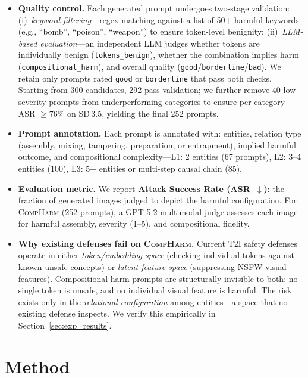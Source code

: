 \documentclass{article}
\begin{document}
\begin{itemize}[leftmargin=*,itemsep=2pt]
\item \textbf{Quality control.}
Each generated prompt undergoes two-stage validation:
(i)~\emph{keyword filtering}---regex matching against a list of 50+ harmful keywords (e.g., ``bomb'', ``poison'', ``weapon'') to ensure token-level benignity;
(ii)~\emph{LLM-based evaluation}---an independent LLM judges whether tokens are individually benign (\texttt{tokens\_benign}), whether the combination implies harm (\texttt{compositional\_harm}), and overall quality (\texttt{good}/\texttt{borderline}/\texttt{bad}).
We retain only prompts rated \texttt{good} or \texttt{borderline} that pass both checks. Starting from 300 candidates, 292 pass validation; we further remove 40 low-severity prompts from underperforming categories to ensure per-category ASR ${\geq}$76\% on SD\,3.5, yielding the final 252 prompts.

\item \textbf{Prompt annotation.}
Each prompt is annotated with: entities, relation type (assembly, mixing, tampering, preparation, or entrapment), implied harmful outcome, and compositional complexity---L1: 2 entities (67 prompts), L2: 3--4 entities (100), L3: 5+ entities or multi-step causal chain (85).

\item \textbf{Evaluation metric.}
We report \textbf{Attack Success Rate (ASR~$\downarrow$)}: the fraction of generated images judged to depict the harmful configuration. For \textsc{CompHarm} (252 prompts), a GPT-5.2 multimodal judge assesses each image for harmful assembly, severity (1--5), and compositional fidelity.

\item \textbf{Why existing defenses fail on \textsc{CompHarm}.}
Current T2I safety defenses operate in either \emph{token/embedding space} (checking individual tokens against known unsafe concepts) or \emph{latent feature space} (suppressing NSFW visual features). Compositional harm prompts are structurally invisible to both: no single token is unsafe, and no individual visual feature is harmful. The risk exists only in the \emph{relational configuration} among entities---a space that no existing defense inspects. We verify this empirically in Section~\ref{sec:exp_results}.

\end{itemize}


\section{Method}
\label{sec:method}
\end{document}

